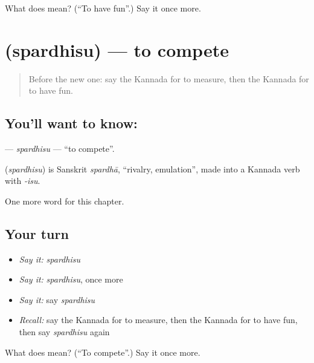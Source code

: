 \begin{tcolorbox}[breakable,colback=teal!4,colframe=teal!35!black,title={Before you move on}]
What does   mean? (\textquotedblleft{}To have fun\textquotedblright{}.) Say it once more.
\end{tcolorbox}
\section[\texorpdfstring{\kn{ಸ್ಪರ್ಧಿಸು} (spardhisu)}{ಸ್ಪರ್ಧಿಸು (spardhisu)}]{ (spardhisu) — to compete}

\label{lesson:KA-C204-spardhisu}



\begin{quote}
Before the new one: say the Kannada for to measure, then the Kannada for to have fun.
\end{quote}

\subsection*{You'll want to know: }
\textbf{} — \emph{spardhisu} — \textquotedblleft{}to compete\textquotedblright{}.

\begin{cousinweb}
\textbf{} (\emph{spardhisu}) is Sanskrit \emph{spardhā}, \textquotedblleft{}rivalry, emulation\textquotedblright{}, made into a Kannada verb with \emph{-isu}.
\end{cousinweb}

\begin{grammarlens}[title={What you've built}]
One more word for this chapter.
\end{grammarlens}

\subsection*{Your turn}
\begin{itemize}
\raggedright
  \item \emph{Say it:} \emph{spardhisu}
  \item \emph{Say it:} \emph{spardhisu}, once more
  \item \emph{Say it:} say \emph{spardhisu}
  \item \emph{Recall:} say the Kannada for to measure, then the Kannada for to have fun, then say \emph{spardhisu} again
\end{itemize}

\begin{tcolorbox}[breakable,colback=teal!4,colframe=teal!35!black,title={Before you move on}]
What does  mean? (\textquotedblleft{}To compete\textquotedblright{}.) Say it once more.
\end{tcolorbox}
